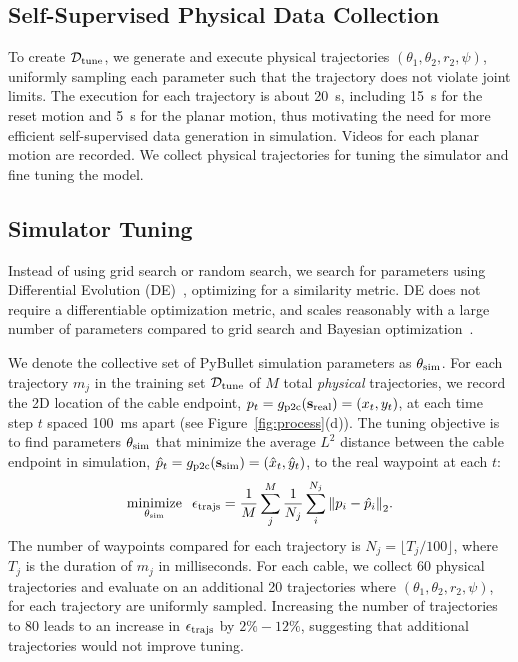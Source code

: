 \documentclass[letterpaper, 10 pt, conference]{ieeeconf}  %
\newcommand{\bs}{\mathbf{s}}
\newcommand{\vmax}{v_{\rm max}}
\DeclareMathOperator*{\minimize}{minimize}
\begin{document}
\subsection{Self-Supervised Physical Data Collection}\label{ssec:phys-data}
To create $\mathcal{D}_{\rm tune}$, we generate and execute physical trajectories $(\theta_1, \theta_2, r_2, \psi)$, uniformly sampling each parameter such that the trajectory does not violate joint limits.
The execution for each trajectory is about \SI{20}{\second}, including \SI{15}{\second} for the reset motion and \SI{5}{\second} for the planar motion, thus motivating the need for more efficient self-supervised data generation in simulation. Videos for each planar motion are recorded. We collect physical trajectories for tuning the simulator and fine tuning the model.

\subsection{Simulator Tuning}\label{ssec:diff-ev}
Instead of using grid search or random search,
we search for parameters using Differential Evolution (DE)~\cite{de_tuning_2020}, optimizing for a similarity metric. DE does not require a differentiable optimization metric, and scales reasonably with a large number of parameters compared to grid search and Bayesian optimization~\cite{de_tuning_2020}.%

We denote the collective set of PyBullet simulation parameters as $\theta_{\rm sim}$. For each trajectory $m_j$ in the training set $\mathcal{D}_{\rm tune}$ of $M$ total \emph{physical} trajectories, we record the 2D location of the cable endpoint, $p_t = g_{\rm p2c}(\bs_{\rm real}) = (x_t, y_t)$, at each time step $t$ spaced \SI{100}{\milli\second} apart (see Figure~\ref{fig:process}(d)). The tuning objective is to find parameters $\theta_{\rm sim}$ that minimize the average $L^2$ distance between the cable endpoint in simulation, $\hat{p}_t = g_{\rm p2c}(\bs_{\rm sim}) = (\hat{x}_t, \hat{y}_t)$, to the real waypoint at each $t$:
\begin{equation}\label{eq:tuning}
    \minimize_{\theta_{\rm sim}} \;\; \epsilon_{\rm trajs} = {\frac{1}{M}\sum_{j}^M{\frac{1}{N_j}\sum_i^{N_j}{\lVert p_i - \hat{p}_i \rVert}_2}}.
\end{equation}
The number of waypoints compared for each trajectory is $N_j = \lfloor {T_j}/{100} \rfloor$, where $T_j$ is the duration of $m_j$ in milliseconds. For each cable, we collect 60 physical trajectories and evaluate on an additional 20 trajectories where $(\theta_1, \theta_2, r_2, \psi)$, for each trajectory are uniformly sampled. Increasing the number of trajectories to 80 leads to an increase in $\epsilon_{\rm trajs}$ by $2\% - 12\%$, suggesting that additional trajectories would not improve tuning.
\end{document}
